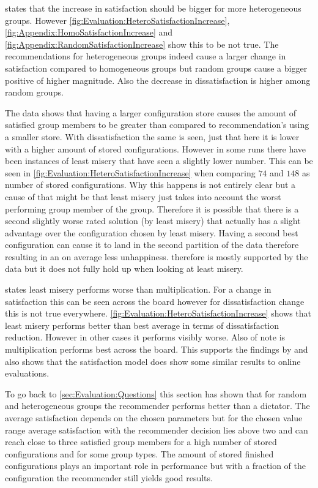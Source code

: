  states that the increase in satisfaction should be bigger for more heterogeneous groups. However \autoref{fig:Evaluation:HeteroSatisfactionIncrease}, \autoref{fig:Appendix:HomoSatisfactionIncrease} and \autoref{fig:Appendix:RandomSatisfactionIncrease} show this to be not true. The recommendations for heterogeneous groups indeed cause a larger change in satisfaction compared to homogeneous groups but random groups cause a bigger positive of higher magnitude. Also the decrease in dissatisfaction is higher among random groups.

The data shows that having a larger configuration store causes the amount of satisfied group members to be greater than compared to recommendation's using a smaller store. With dissatisfaction the same is seen, just that here it is lower with a higher amount of stored configurations. However in some runs there have been instances of least misery that have seen a slightly lower number. This can be seen in \autoref{fig:Evaluation:HeteroSatisfactionIncrease} when comparing $74$ and $148$ as number of stored configurations. Why this happens is not entirely clear but a cause of that might be that least misery just takes into account the worst performing group member of the group. Therefore it is possible that there is a second slightly worse rated solution (by least misery) that actually has a slight advantage over the configuration chosen by least misery. Having a second best configuration can cause it to land in the second partition of the data therefore resulting in an on average less unhappiness.  therefore is mostly supported by the data but it does not fully hold up when looking at least misery.

 states least misery performs worse than multiplication. For a change in satisfaction this can be seen across the board however for dissatisfaction change this is not true everywhere. \autoref{fig:Evaluation:HeteroSatisfactionIncrease} shows that least misery performs better than best average in terms of dissatisfaction reduction. However in other cases it performs visibly worse. Also of note is multiplication performs best across the board. This supports the findings by \citeauthor{Masthoff2015} \cite[p. 755f]{Masthoff2015} and also shows that the satisfaction model does show some similar results to online evaluations.


To go back to \autoref{sec:Evaluation:Questions} this section has shown that for random and heterogeneous groups the recommender performs better than a dictator. The average satisfaction depends on the chosen parameters but for the chosen value range average satisfaction with the recommender decision lies above two and can reach close to three satisfied group members for a high number of stored configurations and for some group types. The amount of stored finished configurations plays an important role in performance but with a fraction of the configuration the recommender still yields good results.

